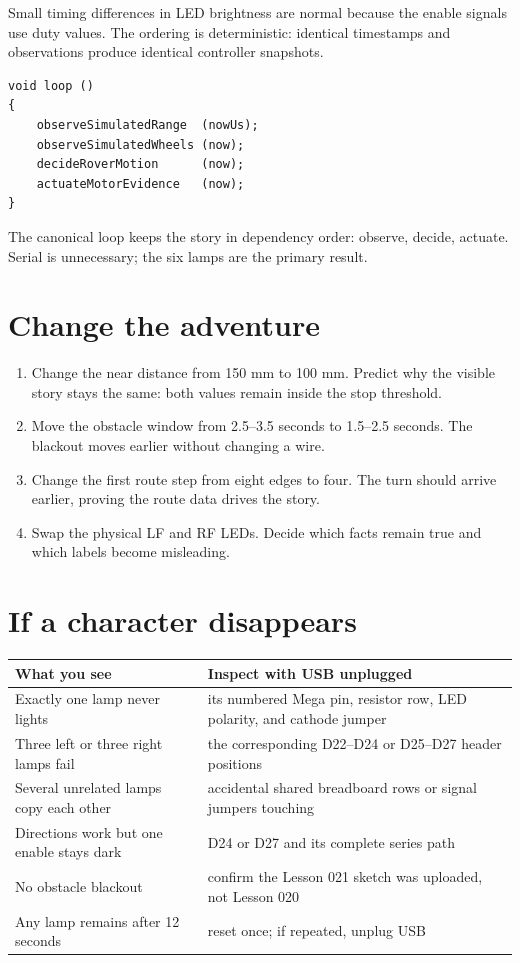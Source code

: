 \documentclass[11pt]{article}
\begin{document}
Small timing differences in LED brightness are normal because the enable
signals use duty values. The ordering is deterministic: identical timestamps
and observations produce identical controller snapshots.

\begin{lstlisting}[style=adkcpp]
void loop ()
{
    observeSimulatedRange  (nowUs);
    observeSimulatedWheels (now);
    decideRoverMotion      (now);
    actuateMotorEvidence   (now);
}
\end{lstlisting}

The canonical loop keeps the story in dependency order: observe, decide,
actuate. Serial is unnecessary; the six lamps are the primary result.

\section{Change the adventure}

\begin{enumerate}
  \item Change the near distance from 150 mm to 100 mm. Predict why the visible
        story stays the same: both values remain inside the stop threshold.
  \item Move the obstacle window from 2.5--3.5 seconds to 1.5--2.5 seconds.
        The blackout moves earlier without changing a wire.
  \item Change the first route step from eight edges to four. The turn should
        arrive earlier, proving the route data drives the story.
  \item Swap the physical LF and RF LEDs. Decide which facts remain true and
        which labels become misleading.
\end{enumerate}

\section{If a character disappears}

\begin{tabularx}{\linewidth}{@{}l X@{}}
\toprule
What you see & Inspect with USB unplugged\\
\midrule
Exactly one lamp never lights & its numbered Mega pin, resistor row, LED
polarity, and cathode jumper\\
Three left or three right lamps fail & the corresponding D22--D24 or D25--D27
header positions\\
Several unrelated lamps copy each other & accidental shared breadboard rows
or signal jumpers touching\\
Directions work but one enable stays dark & D24 or D27 and its complete series
path\\
No obstacle blackout & confirm the Lesson 021 sketch was uploaded, not Lesson
020\\
Any lamp remains after 12 seconds & reset once; if repeated, unplug USB\\
\bottomrule
\end{tabularx}
\end{document}
